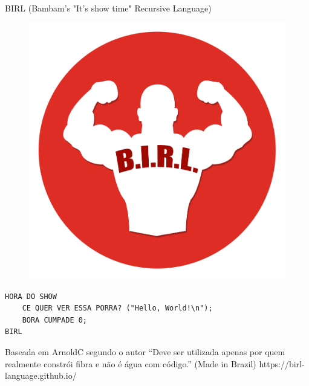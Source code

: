 \begin{frame}[fragile]{BIRL (Bambam's "It's show time" Recursive Language)}
\begin{figure}[ht!]
  \centering
  \includegraphics[scale=0.1]{images/birl.png}
\end{figure}
\lstset{language=Rust, style=boxed}
\begin{lstlisting}
HORA DO SHOW
    CE QUER VER ESSA PORRA? ("Hello, World!\n");
    BORA CUMPADE 0;
BIRL
\end{lstlisting}
\small{Baseada em ArnoldC segundo o autor ``Deve ser utilizada apenas por quem realmente constrói fibra e não é água com código.'' (Made in Brazil)}
\small{https://birl-language.github.io/ }
\end{frame}
